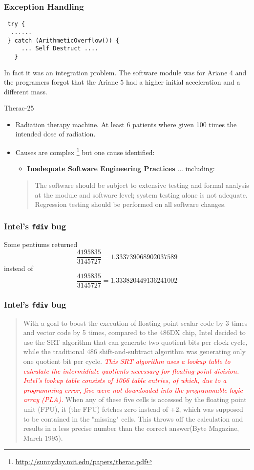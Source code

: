 \documentclass{beamer}
\begin{document}
\begin{frame}[fragile]
  \frametitle{Exception Handling}
\begin{lstlisting}
 try {
  ......
 } catch (ArithmeticOverflow()) {
     ... Self Destruct .... 
   } 
\end{lstlisting}
In fact it was an integration problem. The software module was for
Ariane 4 and the programers  forgot that the Ariane 5 had a higher initial
acceleration and a different mass.  
\end{frame}
\begin{frame}{Therac-25}
  \begin{itemize}
  \item  Radiation therapy machine. At least 6 patients where given
    100 times the intended dose of radiation. 
  \item Causes are complex
    \footnote{\url{http://sunnyday.mit.edu/papers/therac.pdf}} but one
    cause identified:
    \begin{itemize}
    \item      {\bf Inadequate Software Engineering Practices} ... including:
    \end{itemize}
    \begin{quote}
     The software should be subject to extensive testing and formal
     analysis at the module and software level; system testing alone
     is not adequate.  Regression testing should be performed on all
     software changes. 
    \end{quote}
  \end{itemize}  
\end{frame}
\begin{frame}
  \frametitle{Intel's {\tt fdiv} bug}
   
Some pentiums returned
\[
\frac{4195835}{3145727} = 1.333739068902037589
\]
instead of 
\[
\frac{4195835}{3145727} = 1.333820449136241002
\]

\end{frame}
\begin{frame}
  \frametitle{Intel's {\tt fdiv} bug}
  \begin{quote}
    With a goal to boost the execution of floating-point scalar code by 3
    times and vector code by 5 times, compared to the 486DX chip, Intel
    decided to use the SRT algorithm that can generate two quotient bits per
    clock cycle, while the traditional 486 shift-and-subtract algorithm was
    generating only one quotient bit per cycle. \textcolor{red}{\em This SRT
      algorithm uses a lookup table to calculate the intermidiate quotients
      necessary for floating-point division. Intel's lookup table consists of
      1066 table entries, of which, due to a programming error, five were not
      downloaded into the programmable logic array (PLA).} When any of these
    five cells is accessed by the floating point unit (FPU), it (the FPU)
    fetches zero instead of +2, which was supposed to be contained in the
    "missing" cells. This throws off the calculation and results in a less
    precise number than the correct answer(Byte Magazine, March 1995).
  \end{quote}
\end{frame}
\end{document}
